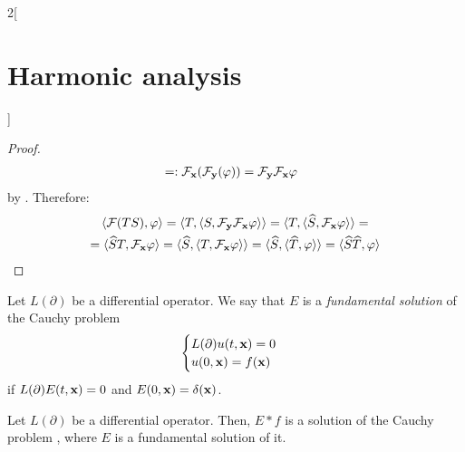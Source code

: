\documentclass[../../../main_math.tex]{subfiles}
\begin{document}
\begin{multicols}{2}[\section{Harmonic analysis}]
\begin{proof}
\begin{align*}
                                 & =:\mathcal{F}_{\boldsymbol{\mathrm{x}}}(\mathcal{F}_{\boldsymbol{\mathrm{y}}}(\varphi))=\mathcal{F}_{\boldsymbol{\mathrm{y}}}\mathcal{F}_{\boldsymbol{\mathrm{x}}}\varphi
    \end{align*}
    by .
    Therefore:
    \begin{multline*}
      \langle \mathcal{F}(TS),\varphi\rangle=\langle T,\langle S,\mathcal{F}_{\boldsymbol{\mathrm{y}}}\mathcal{F}_{\boldsymbol{\mathrm{x}}}\varphi\rangle\rangle= \langle T,\langle \widehat{S}, \mathcal{F}_{\boldsymbol{\mathrm{x}}}\varphi\rangle\rangle=\\=\langle \widehat{S}T, \mathcal{F}_{\boldsymbol{\mathrm{x}}}\varphi \rangle=\langle \widehat{S}, \langle T, \mathcal{F}_{\boldsymbol{\mathrm{x}}}\varphi \rangle\rangle=\langle \widehat{S}, \langle \widehat{T}, \varphi \rangle\rangle=\langle \widehat{S}\widehat{T}, \varphi \rangle
    \end{multline*}
  \end{proof}
  \begin{definition}
    Let $L(\partial)$ be a differential operator. We say that $E$ is a \emph{fundamental solution} of the Cauchy problem
    \begin{equation}\label{HA:cauchy}
      \begin{cases}
        L(\partial)u(t,\boldsymbol{\mathrm{x}})=0 \\
        u(0,\boldsymbol{\mathrm{x}})= f(\boldsymbol{\mathrm{x}})
      \end{cases}
    \end{equation}
    if $L(\partial)E(t,\boldsymbol{\mathrm{x}})=0$ and $E(0,\boldsymbol{\mathrm{x}})=\delta(\boldsymbol{\mathrm{x}})$.
  \end{definition}
  \begin{theorem}
    Let $L(\partial)$ be a differential operator. Then, $E*f$ is a solution of the Cauchy problem , where $E$ is a fundamental solution of it.
  \end{theorem}

\end{multicols}
\end{document}
